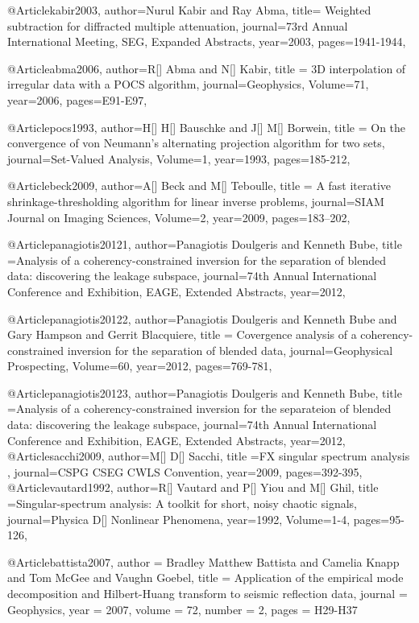 @Article{kabir2003,
  author={Nurul Kabir and Ray Abma},
  title={	Weighted subtraction for diffracted multiple attenuation},
  journal={73rd Annual International Meeting, SEG, Expanded Abstracts},
  year=2003,
  pages={1941-1944},
}

@Article{abma2006,
  author={R[] Abma and N[] Kabir},
  title = {3{D} interpolation of irregular data with a {POCS} algorithm},
  journal={Geophysics},
  Volume=71,
  year=2006,
  pages={E91-E97},
}

@Article{pocs1993,
  author={H[] H[] Bauschke and J[] M[] Borwein},
  title = {On the convergence of von Neumann's alternating projection algorithm for two sets},
  journal={Set-Valued Analysis},
  Volume=1,
  year=1993,
  pages={185-212},
}


@Article{beck2009,
  author={A[] Beck and M[] Teboulle},
  title = {A fast iterative shrinkage-thresholding algorithm for
linear inverse problems},
  journal={SIAM Journal on Imaging Sciences},
  Volume=2,
  year=2009,
  pages={183–202},
}

@Article{panagiotis20121,
  author={Panagiotis Doulgeris and Kenneth Bube},
  title ={Analysis of a coherency-constrained inversion for the separation of blended data: discovering the leakage subspace},
  journal={74th Annual International Conference and Exhibition, EAGE, Extended Abstracts},
  year=2012,
  }

@Article{panagiotis20122,
  author={Panagiotis Doulgeris and Kenneth Bube and Gary Hampson and Gerrit Blacquiere},
  title = {Covergence analysis of a coherency-constrained inversion for the separation of blended data},
  journal={Geophysical Prospecting},
  Volume=60,
  year=2012,
  pages={769-781},
}

@Article{panagiotis20123,
  author={Panagiotis Doulgeris and Kenneth Bube},
  title ={Analysis of a coherency-constrained inversion for the separateion of blended data: discovering the leakage subspace},
  journal={74th Annual International Conference and Exhibition, EAGE, Extended Abstracts},
  year=2012,
  }
@Article{sacchi2009,
  author={M[] D[] Sacchi},
  title ={{FX} singular spectrum analysis },
  journal={CSPG CSEG CWLS Convention},
  year=2009,
  pages={392-395},
}
@Article{vautard1992,
  author={R[] Vautard and P[] Yiou and M[] Ghil},
  title ={Singular-spectrum analysis: A toolkit for short, noisy chaotic signals},
  journal={Physica D[] Nonlinear Phenomena},
  year=1992,
  Volume=1-4,
  pages={95-126},
}

@Article{battista2007,
  author = 	 {Bradley Matthew Battista and Camelia Knapp and Tom McGee and Vaughn Goebel},
  title = 	 {Application of the empirical mode decomposition and
{Hilbert-Huang} transform to seismic reflection data},
  journal = 	 {Geophysics},
  year = 	 2007,
  volume = 	 72,
  number = 	 2,
  pages = 	 {H29-H37}}

